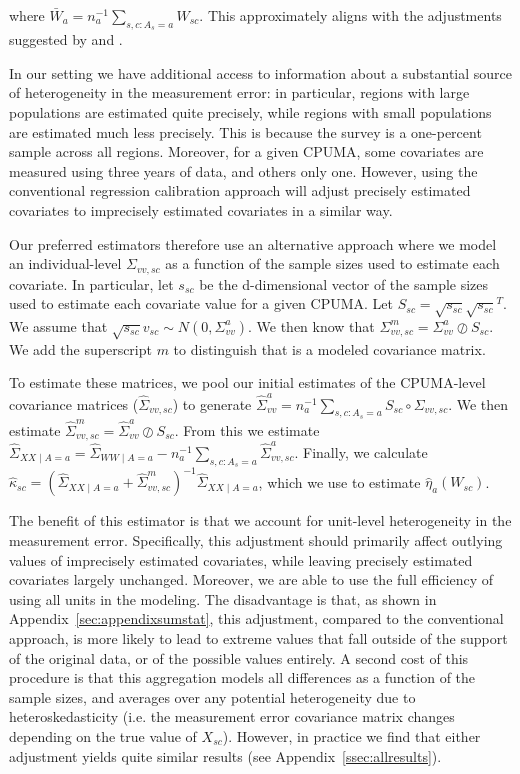 where $\bar{W}_a = n_a^{-1}\sum_{s, c: A_s = a} W_{sc}$. This approximately aligns with the adjustments suggested by \cite{carroll2006measurement} and \cite{gleser1992importance}. 

In our setting we have additional access to information about a substantial source of heterogeneity in the measurement error: in particular, regions with large populations are estimated quite precisely, while regions with small populations are estimated much less precisely. This is because the survey is a one-percent sample across all regions. Moreover, for a given CPUMA, some covariates are measured using three years of data, and others only one. However, using the conventional regression calibration approach will adjust precisely estimated covariates to imprecisely estimated covariates in a similar way. 

Our preferred estimators therefore use an alternative approach where we model an individual-level $\Sigma_{vv, sc}$ as a function of the sample sizes used to estimate each covariate. In particular, let $s_{sc}$ be the d-dimensional vector of the sample sizes used to estimate each covariate value for a given CPUMA. Let $S_{sc} = \sqrt{s_{sc}}\sqrt{s_{sc}}^T$. We assume that $\sqrt{s_{sc}}v_{sc} \sim N(0, \Sigma_{vv}^a)$. We then know that $\Sigma_{vv, sc}^m = \Sigma_{vv}^a \oslash S_{sc}$. We add the superscript $m$ to distinguish that is a modeled covariance matrix.

To estimate these matrices, we pool our initial estimates of the CPUMA-level covariance matrices ($\hat{\Sigma}_{vv, sc}$) to generate $\hat{\Sigma}_{vv}^a = n_a^{-1}\sum_{s, c: A_s = a} S_{sc} \circ \Sigma_{vv, sc}$. We then estimate $\hat{\Sigma}_{vv, sc}^m = \hat{\Sigma}_{vv}^a \oslash S_{sc}$. From this we estimate $\hat{\Sigma}_{XX \mid A = a} = \hat{\Sigma}_{WW \mid A = a} - n_a^{-1}\sum_{s, c: A_s = a}\hat{\Sigma}_{vv, sc}^a$. Finally, we calculate $\hat{\kappa}_{sc} = (\hat{\Sigma}_{XX \mid A = a} + \hat{\Sigma}_{vv, sc}^m)^{-1}\hat{\Sigma}_{XX \mid A = a}$, which we use to estimate $\hat{\eta}_a(W_{sc})$. 

The benefit of this estimator is that we account for unit-level heterogeneity in the measurement error. Specifically, this adjustment should primarily affect outlying values of imprecisely estimated covariates, while leaving precisely estimated covariates largely unchanged. Moreover, we are able to use the full efficiency of using all units in the modeling. The disadvantage is that, as shown in Appendix~\ref{sec:appendixsumstat}, this adjustment, compared to the conventional approach, is more likely to lead to extreme values that fall outside of the support of the original data, or of the possible values entirely. A second cost of this procedure is that this aggregation models all differences as a function of the sample sizes, and averages over any potential heterogeneity due to heteroskedasticity (i.e. the measurement error covariance matrix changes depending on the true value of $X_{sc}$). However, in practice we find that either adjustment yields quite similar results (see Appendix~\ref{ssec:allresults}).
